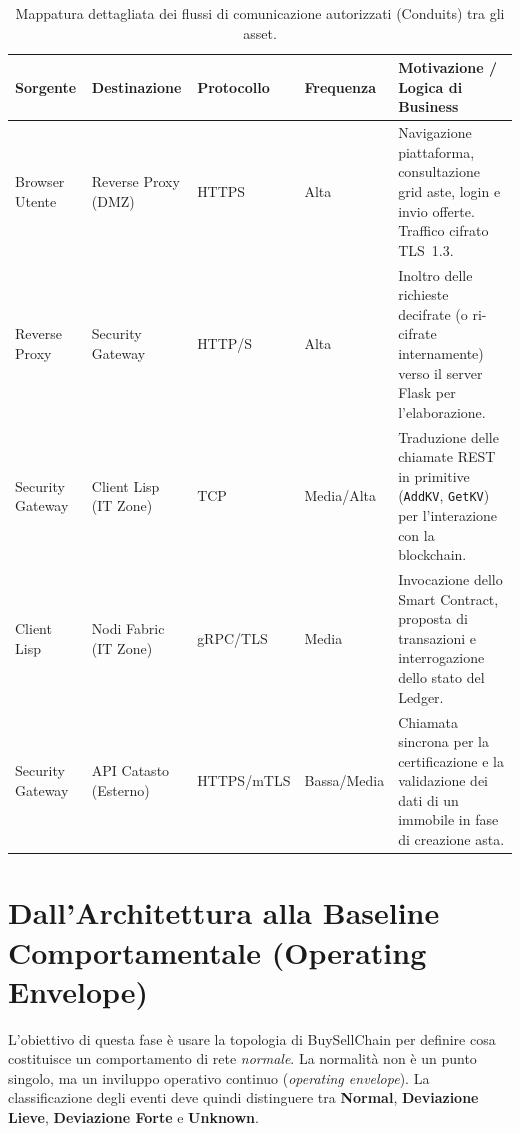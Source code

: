\begin{table}[h]
\centering
\footnotesize
\renewcommand{\arraystretch}{1.4}
\begin{tabularx}{\textwidth}{p{2.4cm} p{2.4cm} p{1.6cm} p{1.6cm} X}
\toprule
\textbf{Sorgente} & \textbf{Destinazione} & \textbf{Protocollo} & \textbf{Frequenza} & \textbf{Motivazione / Logica di Business} \\
\midrule
Browser Utente &
    Reverse Proxy (DMZ) & HTTPS & Alta &
    Navigazione piattaforma, consultazione grid aste, login e invio offerte. Traffico cifrato TLS~1.3. \\[4pt]
Reverse Proxy &
    Security Gateway & HTTP/S & Alta &
    Inoltro delle richieste decifrate (o ri-cifrate internamente) verso il server Flask per l'elaborazione. \\[4pt]
Security Gateway &
    Client Lisp (IT Zone) & TCP & Media/Alta &
    Traduzione delle chiamate REST in primitive (\texttt{AddKV}, \texttt{GetKV}) per l'interazione con la blockchain. \\[4pt]
Client Lisp &
    Nodi Fabric (IT Zone) & gRPC/TLS & Media &
    Invocazione dello Smart Contract, proposta di transazioni e interrogazione dello stato del Ledger. \\[4pt]
Security Gateway &
    API Catasto (Esterno) & HTTPS/mTLS & Bassa/Media &
    Chiamata sincrona per la certificazione e la validazione dei dati di un immobile in fase di creazione asta. \\
\bottomrule
\end{tabularx}
\caption{Mappatura dettagliata dei flussi di comunicazione autorizzati (Conduits) tra gli asset.}
\label{tab:conduits}
\end{table}

\newpage

\section{Dall'Architettura alla Baseline Comportamentale (Operating Envelope)}

L'obiettivo di questa fase è usare la topologia di BuySellChain per definire cosa costituisce un comportamento di rete \textit{normale}.
La normalità non è un punto singolo, ma un inviluppo operativo continuo (\textit{operating envelope}).
La classificazione degli eventi deve quindi distinguere tra \textbf{Normal}, \textbf{Deviazione Lieve}, \textbf{Deviazione Forte} e \textbf{Unknown}.

